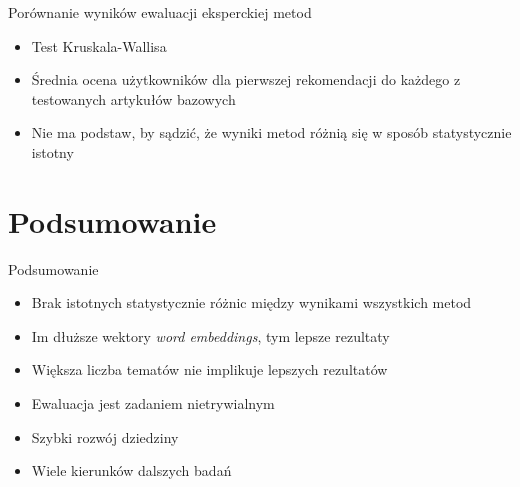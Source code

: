 \documentclass{beamer}
\begin{document}
	\begin{frame}{Porównanie wyników ewaluacji eksperckiej metod}
		\begin{itemize}
			\setlength\itemsep{2em}
			\item Test Kruskala-Wallisa
			\item Średnia ocena użytkowników dla pierwszej rekomendacji do każdego z testowanych artykułów bazowych
			\item Nie ma podstaw, by sądzić, że wyniki metod różnią się w sposób statystycznie istotny
		\end{itemize}
	\end{frame}
	\section{Podsumowanie}
	\begin{frame}{Podsumowanie}
		\begin{itemize}
			\item Brak istotnych statystycznie różnic między wynikami wszystkich metod
			\item Im dłuższe wektory \emph{word embeddings}, tym lepsze rezultaty
			\item Większa liczba tematów nie implikuje lepszych rezultatów
		\end{itemize}
		\begin{itemize}
			\item Ewaluacja jest zadaniem nietrywialnym
			\item Szybki rozwój dziedziny
			\item Wiele kierunków dalszych badań
		\end{itemize}
	\end{frame}
\end{document}
